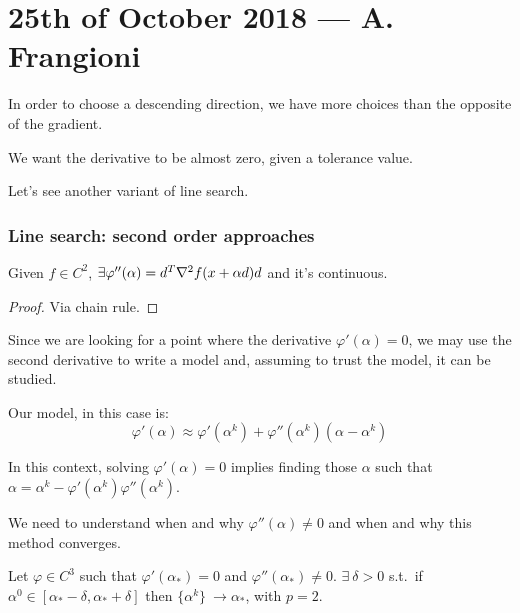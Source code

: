 \documentclass[ComputationalMathematics.tex]{subfiles}
\begin{document}
\section{25th of October 2018 --- A. Frangioni}

In order to choose a descending direction, we have more choices than the opposite of the gradient.

We want the derivative to be almost zero, given a tolerance value. 

Let's see another variant of line search.

\subsubsection{Line search: second order approaches}

\begin{theorem}
  Given $f \in C^2$,  $\exists \varphi''(\alpha) = {d}^{T} \nabla^{2} f(x + \alpha d ) d$ and it's continuous.
\end{theorem}
\begin{proof}
Via chain rule.
\end{proof}

Since we are looking for a point where the derivative $\varphi'(\alpha) = 0$, we may use the second derivative to write a model and, assuming to trust the model, it can be studied.

\begin{definition}
Our model, in this case is:
  \[
    \varphi'(\alpha) \approx \varphi'(\alpha^k) + \varphi''(\alpha^k)(\alpha - \alpha^k)
  \]
\end{definition}

In this context, solving $\varphi'(\alpha) = 0$ implies finding those $\alpha$ such that $\alpha = \alpha^k - \varphi'(\alpha^k) \varphi''(\alpha^k)$.


We need to understand when and why $\varphi''(\alpha) \ne 0$ and when and why this method converges.
\begin{theorem}
Let $\varphi \in C^{3}$ such that $\varphi'(\alpha_*) = 0$ and $\varphi''(\alpha_*) \neq 0$. $\exists~\delta > 0$ s.t.~if $\alpha^0 \in [\alpha_* - \delta, \alpha_* + \delta]$ then $\{\alpha^k \}~\to \alpha_*$, with $p = 2$.
\end{theorem}
\end{document}
